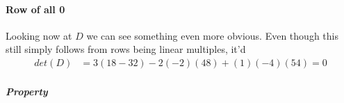 \documentclass{article}
\begin{document}
      \paragraph{Row of all 0}
          Looking now at $D$ we can see something even more obvious.
          Even though this still simply follows from rows being linear multiples, it'd
          \begin{align*}
            det(D)&=3(18-32)-2(-2)(48)+(1)(-4)(54)=0
          \end{align*}
        \subparagraph{Property}
          
\end{document}
